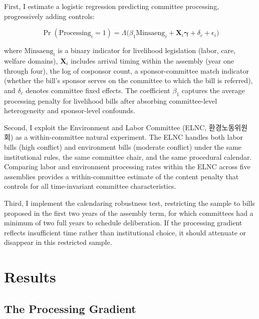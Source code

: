 \documentclass[11pt]{article}
\begin{document}
First, I estimate a logistic regression predicting committee processing, progressively adding controls:

\begin{equation}
\Pr(\text{Processing}_i = 1) = \Lambda\bigl(\beta_1 \text{Minsaeng}_i + \mathbf{X}_i \boldsymbol{\gamma} + \delta_c + \epsilon_i\bigr)
\label{eq:main}
\end{equation}

\noindent where $\text{Minsaeng}_i$ is a binary indicator for livelihood legislation (labor, care, welfare domains), $\mathbf{X}_i$ includes arrival timing within the assembly (year one through four), the log of cosponsor count, a sponsor-committee match indicator (whether the bill's sponsor serves on the committee to which the bill is referred), and $\delta_c$ denotes committee fixed effects. The coefficient $\beta_1$ captures the average processing penalty for livelihood bills after absorbing committee-level heterogeneity and sponsor-level confounds.

Second, I exploit the Environment and Labor Committee (ELNC, 환경노동위원회) as a within-committee natural experiment. The ELNC handles both labor bills (high conflict) and environment bills (moderate conflict) under the same institutional rules, the same committee chair, and the same procedural calendar. Comparing labor and environment processing rates within the ELNC across five assemblies provides a within-committee estimate of the content penalty that controls for all time-invariant committee characteristics.

Third, I implement the calendaring robustness test, restricting the sample to bills proposed in the first two years of the assembly term, for which committees had a minimum of two full years to schedule deliberation. If the processing gradient reflects insufficient time rather than institutional choice, it should attenuate or disappear in this restricted sample.


\section{Results}
\label{sec:results}

\subsection{The Processing Gradient}
\end{document}
